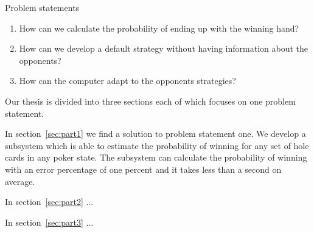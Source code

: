 \vspace{4mm}
\begin{statementBox2}{Problem statements}
\begin{enumerate}
    \item \label{itm:q1} How can we calculate the probability of ending up with the winning hand? 
    \item \label{itm:q2} How can we develop a default strategy without having information about the opponents? 
    \item \label{itm:q3} How can the computer adapt to the opponents strategies?
  \end{enumerate}
\end{statementBox2}
\vspace{4mm}

Our thesis is divided into three sections each of which focuses on one problem statement.

In section~\ref{sec:part1} we find a solution to problem statement one. We develop a subsystem which is able to estimate the probability of winning for any set of hole cards in any poker state. The subsystem can calculate the probability of winning with an error percentage of one percent and it takes less than a second on average.

In section~\ref{sec:part2} ...

In section~\ref{sec:part3} ...
